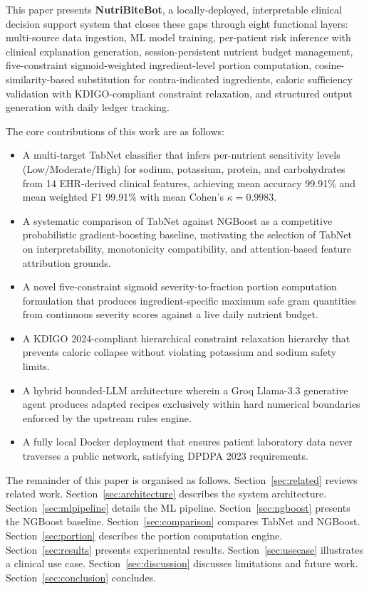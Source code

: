 \documentclass[journal]{IEEEtran}
\begin{document}
This paper presents \textbf{NutriBiteBot}, a locally-deployed,
interpretable clinical decision support system that closes these gaps
through eight functional layers: multi-source data ingestion, ML model
training, per-patient risk inference with clinical explanation
generation, session-persistent nutrient budget management,
five-constraint sigmoid-weighted ingredient-level portion computation,
cosine-similarity-based substitution for contra-indicated ingredients,
caloric sufficiency validation with KDIGO-compliant constraint
relaxation, and structured output generation with daily ledger tracking.

The core contributions of this work are as follows:
\begin{itemize}
    \item A multi-target TabNet classifier that infers per-nutrient
    sensitivity levels (Low/Moderate/High) for sodium, potassium,
    protein, and carbohydrates from 14 EHR-derived clinical features,
    achieving mean accuracy 99.91\% and mean weighted F1 99.91\% with
    mean Cohen's $\kappa = 0.9983$.
    \item A systematic comparison of TabNet against NGBoost as a
    competitive probabilistic gradient-boosting baseline, motivating the
    selection of TabNet on interpretability, monotonicity compatibility,
    and attention-based feature attribution grounds.
    \item A novel five-constraint sigmoid severity-to-fraction portion
    computation formulation that produces ingredient-specific maximum safe
    gram quantities from continuous severity scores against a live daily
    nutrient budget.
    \item A KDIGO 2024-compliant hierarchical constraint relaxation
    hierarchy that prevents caloric collapse without violating potassium
    and sodium safety limits.
    \item A hybrid bounded-LLM architecture wherein a Groq Llama-3.3
    generative agent produces adapted recipes exclusively within hard
    numerical boundaries enforced by the upstream rules engine.
    \item A fully local Docker deployment that ensures patient laboratory
    data never traverses a public network, satisfying DPDPA 2023
    requirements.
\end{itemize}

The remainder of this paper is organised as follows.
Section~\ref{sec:related} reviews related work.
Section~\ref{sec:architecture} describes the system architecture.
Section~\ref{sec:mlpipeline} details the ML pipeline.
Section~\ref{sec:ngboost} presents the NGBoost baseline.
Section~\ref{sec:comparison} compares TabNet and NGBoost.
Section~\ref{sec:portion} describes the portion computation engine.
Section~\ref{sec:results} presents experimental results.
Section~\ref{sec:usecase} illustrates a clinical use case.
Section~\ref{sec:discussion} discusses limitations and future work.
Section~\ref{sec:conclusion} concludes.
\end{document}
